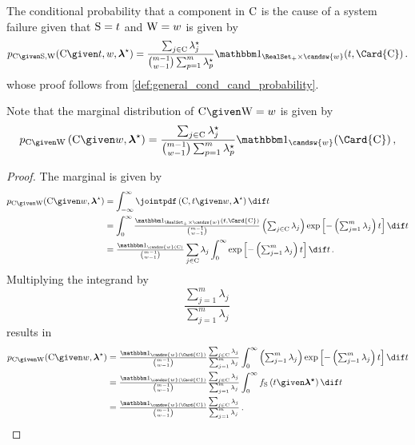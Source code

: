 \documentclass[../main.tex]{subfiles}
\begin{document}
The conditional probability that a component in $\mathrm{C}$ is the cause of a system failure given that $\mathrm{S} = t$ and $\mathrm{W} = w$ is given by
\begin{equation}
\label{eq:expo_cand_given_s}
    \pmf_{\rvcand \given \sv, \RV{W}}(\cand \given t, w, \tparam{\vec\lambda}) =
        \frac{ \sum_{j \in \cand} \tparam{\lambda}_j }
            { \binom{m-1}{w-1} \sum_{p=1}^{m} \tparam{\lambda}_p } \SetIndicator{\RealSet_{+} \times \candsw{w}}(t,\Card{\cand})\,.
\end{equation}
whose proof follows from \cref{def:general_cond_cand_probability}.

Note that the marginal distribution of $\rvcand \given \RV{W} = w$ is given by
\begin{equation}
\label{eq:expo_cand_given_s}
     \pmf_{\rvcand \given \RV{W}}\left(\cand \given w, \tparam{\vec\lambda}\right) =
        \frac{ \sum_{j \in \cand} \tparam{\lambda}_j }
            { \binom{m-1}{w-1} \sum_{p=1}^{m} \tparam{\lambda}_p } \SetIndicator{\candsw{w}}(\Card{\cand})\,,
\end{equation}
\begin{proof}
The marginal is given by
\begin{align}
     \pmf_{\rvcand \given \RV{W}}(\cand \given w, \tparam{\vec\lambda})
        &= \int_{-\infty}^{\infty} \jointpdf\left(\cand, t \given w, \tparam{\vec\lambda}\right) \dif t\\
        &= \int_{0}^{\infty} \mathsmaller{\frac{\SetIndicator{\RealSet_{+} \times \candsw{w}}(t,\Card{\cand})}{\binom{m-1}{w-1}}
        	\left ( \sum_{j \in \cand} \lambda_j \right ) \exp \left [ - \left ( \sum_{j=1}^{m} \lambda_j \right ) t \right ] \dif t}\\
        &= \mathsmaller{\frac{ \SetIndicator{\candsw{w}(\cand)}}{\binom{m-1}{w-1}}} \sum_{j \in \cand} \lambda_j \int_{0}^{\infty} \mathsmaller{ \exp \left [ - \left ( \sum_{j=1}^{m} \lambda_j \right ) t \right ] \dif t}\,.
\end{align}
Multiplying the integrand by
\begin{equation}
    \frac{\sum_{j=1}^{m} \lambda_j}{\sum_{j=1}^{m} \lambda_j}\,
\end{equation}
results in
\begin{align}
     \pmf_{\rvcand \given \RV{W}}(\cand \given w, \tparam{\vec\lambda})
        &= \mathsmaller{\frac{ \SetIndicator{\candsw{w}(\Card{\cand})} }{\binom{m-1}{w-1}} \frac{\sum_{j \in \cand} \lambda_j}{\sum_{j=1}^{m} \lambda_j}} \int_{0}^{\infty} \mathsmaller{ \left ( \sum_{j=1}^{m} \lambda_j \right) \exp \left [ - \left ( \sum_{j=1}^{m} \lambda_j \right ) t \right ] \dif t}\\
        &= \mathsmaller{\frac{ \SetIndicator{\candsw{w}(\Card{\cand})} }{\binom{m-1}{w-1}} \frac{\sum_{j \in \cand} \lambda_j}{\sum_{j=1}^{m} \lambda_j}} \int_{0}^{\infty} \spdf\left(t \given \vec{\tparam\lambda}\right) \dif t\\
        &= \mathsmaller{\frac{ \SetIndicator{\candsw{w}(\Card{\cand})}}{\binom{m-1}{w-1}} \frac{\sum_{j \in \cand} \lambda_j}{\sum_{j=1}^{m} \lambda_j}}\,.
\end{align}
\end{proof}
\end{document}
